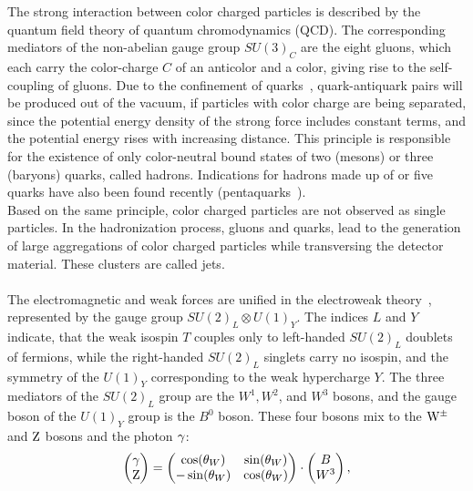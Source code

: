 The strong interaction between color charged particles is described by the quantum field theory of quantum chromodynamics (QCD). The corresponding mediators of the non-abelian gauge group $SU(3)_C$ are the eight gluons, which each carry the color-charge $C$ of an anticolor and a color, giving rise to the self-coupling of gluons. Due to the confinement of quarks~\cite{Confinement}, quark-antiquark pairs will be produced out of the vacuum, if particles with color charge are being separated, since the potential energy density of the strong force includes constant terms, and the potential energy rises with increasing distance. This principle is responsible for the existence of only color-neutral bound states of two (mesons) or three (baryons) quarks, called hadrons. Indications for hadrons made up of or five quarks have also been found recently (pentaquarks~\cite{Pentaquarks}).\\
Based on the same principle, color charged particles are not observed as single particles. In the hadronization process, gluons and quarks, lead to the generation of large aggregations of color charged particles while transversing the detector material. These clusters are called jets.
\\\\
The electromagnetic and weak forces are unified in the electroweak theory~\cite{Weinberg,Weinberg2,Salam,Glashow}, represented by the gauge group $ SU(2)_L\otimes U(1)_Y$. The indices $L$ and $Y$ indicate, that the weak isospin $T$ couples only to left-handed $SU(2)_L$ doublets of fermions, while the right-handed $SU(2)_L$ singlets carry no isospin, and the symmetry of the $U(1)_Y$ corresponding to the weak hypercharge $Y$. The three mediators of the $SU(2)_L$ group are the $W^1,W^2$, and $W^3$ bosons, and the gauge boson of the $U(1)_Y$ group is the $B^0$ boson.
These four bosons mix to the $\mathrm{W}^\pm$ and $\mathrm{Z}$ bosons and the photon $\gamma$:
\begin{equation}
 \left(
 \begin{matrix}
  \gamma \\
  \mathrm{Z}
 \end{matrix}
 \right)
 =
 \left(\begin{matrix}
  \cos(\theta_W)  & \sin(\theta_W) \\
  -\sin(\theta_W) & \cos(\theta_W) 
 \end{matrix}\right)
 \cdot
 \left(
 \begin{matrix}
  B \\
  W^3
 \end{matrix}
 \right),
\end{equation}

